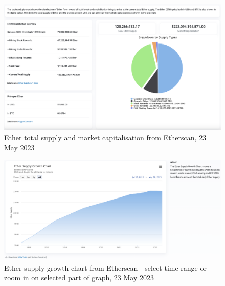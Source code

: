 \documentclass[UTF8]{article}
\begin{document}
\begin{figure}[htbp]
\begin{center}
\includegraphics[width=0.9\linewidth]{images/totcap}
\caption{Ether total supply and market capitalisation from Etherscan, 23 May 2023}
\label{fig:totcap}
\end{center}
\end{figure}

\begin{figure}[htbp]
\begin{center}
\includegraphics[width=0.9\linewidth]{images/ethgrowth}
\caption{Ether supply growth chart from Etherscan - select time range or zoom in on selected part of graph, 23 May 2023}
\label{fig:ethgrowth}
\end{center}
\end{figure}

\clearpage
\end{document}

